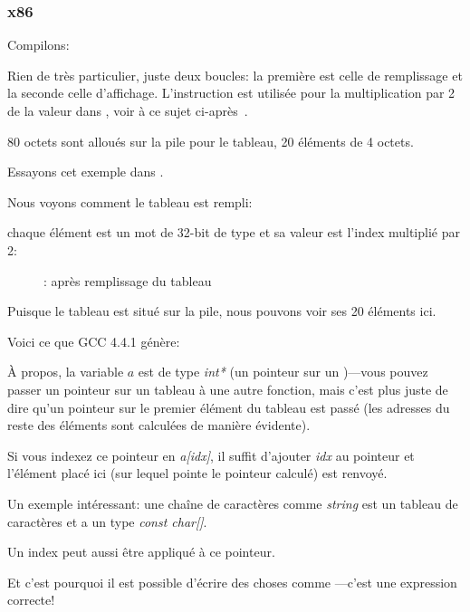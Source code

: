 \subsubsection{x86}


Compilons:




Rien de très particulier, juste deux boucles: la première est celle de remplissage
et la seconde celle d'affichage.
L'instruction  est utilisée pour la multiplication par 2 de la valeur
dans \ECX, voir à ce sujet ci-après~.

80 octets sont alloués sur la pile pour le tableau, 20 éléments de 4 octets.

\clearpage
Essayons cet exemple dans \olly.
\myindex{\olly}

Nous voyons comment le tableau est rempli:

chaque élément est un mot de 32-bit de type \Tint et sa valeur est l'index multiplié
par 2:

\begin{figure}[H]
\centering
{}
\caption{\olly: après remplissage du tableau}
\label{fig:array_simple_olly}
\end{figure}

Puisque le tableau est situé sur la pile, nous pouvons voir ses 20 éléments ici.


Voici ce que GCC 4.4.1 génère:



À propos, la variable $a$ est de type \emph{int*} (un pointeur sur un \Tint{})---vous
pouvez passer un pointeur sur un tableau à une autre fonction, mais c'est plus juste
de dire qu'un pointeur sur le premier élément du tableau est passé (les adresses
du reste des éléments sont calculées de manière évidente).

Si vous indexez ce pointeur en \emph{a[idx]}, il suffit d'ajouter \emph{idx} au pointeur
et l'élément placé ici (sur lequel pointe le pointeur calculé) est renvoyé.

Un exemple intéressant: une chaîne de caractères comme \emph{string} est un tableau
de caractères et a un type \emph{const char[]}.

Un index peut aussi être appliqué à ce pointeur.

Et c'est pourquoi il est possible d'écrire des choses comme ---c'est
une expression \CCpp correcte!

